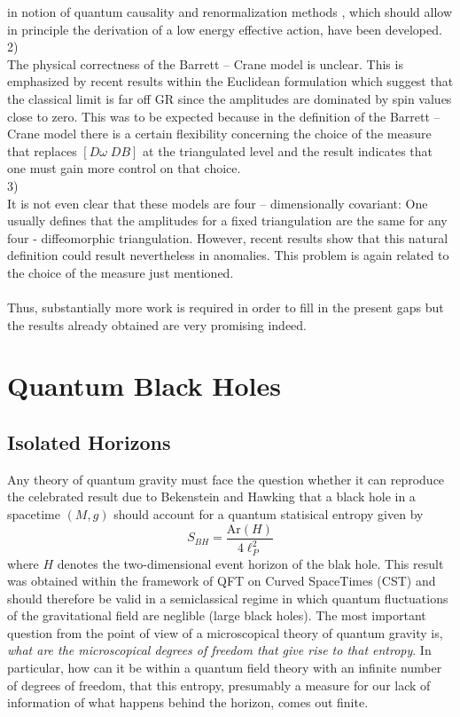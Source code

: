 \documentclass[12pt]{report}
\def\be{\begin{equation}}
\def\ee{\end{equation}}
\begin{document}
in notion of quantum causality and renormalization methods \cite{54b}, 
which should allow in principle the derivation of a low energy effective 
action, have been developed.\\
2)\\
The physical correctness of the Barrett -- Crane model is unclear.
This is emphasized by recent results within the Euclidean formulation 
\cite{55} which suggest that the classical limit is far off GR since the 
amplitudes are dominated by spin values close to zero. This 
was to be expected because in the definition of the Barrett -- Crane 
model there is a certain flexibility concerning the choice of the 
measure that replaces $[D\omega\;DB]$ at the triangulated level and 
the result \cite{55} indicates that one must gain more control on that 
choice.\\
3)\\
It is not even clear that these models are four -- dimensionally
covariant: One usually defines that the amplitudes for a fixed 
triangulation are the same for any four - diffeomorphic triangulation.
However, recent results \cite{56} show that this natural definition 
could result nevertheless in anomalies. This problem is again related to 
the choice of the measure just mentioned.\\
\\
Thus, substantially more work is required in order to fill in the 
present gaps but the results already obtained are very promising indeed.  
 


\section{Quantum Black Holes}
\label{s3.4}

\subsection{Isolated Horizons}
\label{s3.4.1}

Any theory of quantum gravity must face the question whether it can 
reproduce the celebrated result due to Bekenstein and Hawking \cite{57}
that a black hole in a spacetime $(M,g)$ should account for a quantum
statisical entropy given by
\be \label{3.4.1}
S_{BH}=\frac{\mbox{Ar}(H)}{4\ell_P^2}
\ee
where $H$ denotes the two-dimensional event horizon of the blak hole.
This result was obtained within the framework of QFT on Curved SpaceTimes
(CST) and should therefore be valid in a semiclassical regime in which 
quantum fluctuations of the gravitational field are neglible (large black 
holes). The most important question from the point of view of a 
microscopical theory of quantum gravity is, {\it what are the 
microscopical degrees of freedom that give rise to that entropy}. In 
particular, how can it be within a quantum field theory with an infinite 
number of degrees of freedom, that this entropy, presumably a measure for 
our lack of information of what happens behind the horizon, comes out 
finite. 
\end{document}
